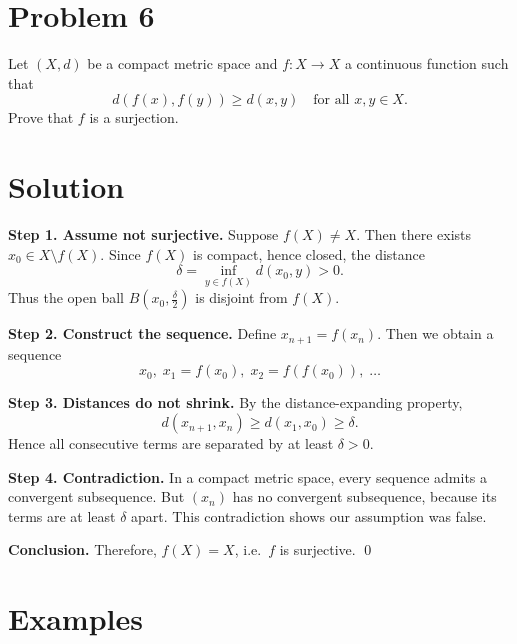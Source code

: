 \documentclass[11pt,a4paper]{article}
\theoremstyle{definition}
\theoremstyle{definition}
\theoremstyle{plain}
\theoremstyle{remark}
\begin{document}
\section*{Problem 6}
Let $(X,d)$ be a compact metric space and $f:X \to X$ a continuous function such that
\[
d(f(x), f(y)) \geq d(x,y) \quad \text{for all } x,y \in X.
\]
Prove that $f$ is a surjection.

\section*{Solution}
\textbf{Step 1. Assume not surjective.}  
Suppose $f(X) \neq X$. Then there exists $x_0 \in X \setminus f(X)$.  
Since $f(X)$ is compact, hence closed, the distance
\[
\delta = \inf_{y \in f(X)} d(x_0,y) > 0.
\]
Thus the open ball $B(x_0,\tfrac{\delta}{2})$ is disjoint from $f(X)$.

\medskip

\textbf{Step 2. Construct the sequence.}  
Define $x_{n+1} = f(x_n)$. Then we obtain a sequence
\[
x_0, \; x_1=f(x_0), \; x_2=f(f(x_0)), \; \dots
\]

\medskip

\textbf{Step 3. Distances do not shrink.}  
By the distance-expanding property,
\[
d(x_{n+1}, x_n) \geq d(x_1, x_0) \geq \delta.
\]
Hence all consecutive terms are separated by at least $\delta > 0$.

\medskip

\textbf{Step 4. Contradiction.}  
In a compact metric space, every sequence admits a convergent subsequence.  
But $(x_n)$ has no convergent subsequence, because its terms are at least $\delta$ apart.  
This contradiction shows our assumption was false.

\medskip

\textbf{Conclusion.}  
Therefore, $f(X)=X$, i.e.\ $f$ is surjective. \qed

\section*{Examples}
\end{document}
